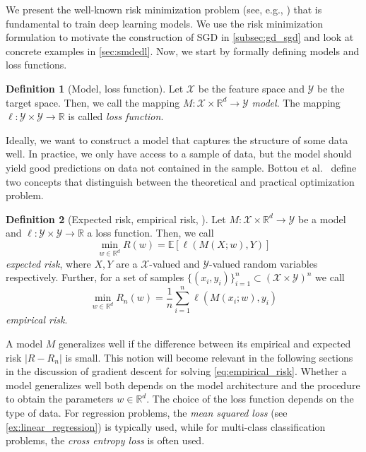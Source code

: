 \documentclass[12pt]{article}
\theoremstyle{definition}
\newtheorem{definition}[definition]{Definition}
\numberwithin{equation}{section}
\newcommand{\R}{\mathbb{R}}
\newcommand{\ev}[1]{\mathbb{E}\left[{#1}\right]}
\begin{document}
We present the well-known risk minimization problem (see, e.g., \cite{bottouOptimizationMethodsLargeScale2018}) that is fundamental to train deep learning models. We use the risk minimization formulation to motivate the construction of SGD in \autoref{subsec:gd_sgd} and look at concrete examples in \autoref{sec:smdedl}. Now, we start by formally defining models and loss functions.
\begin{definition}[Model, loss function]
  Let $\mathcal{X}$ be the feature space and $\mathcal{Y}$ be the target space. Then, we call the mapping $M : \mathcal{X} \times \R^d \rightarrow \mathcal{Y}$ \emph{model}. The mapping $\ell : \mathcal{Y} \times \mathcal{Y} \rightarrow \R$ is called \emph{loss function}.
\end{definition}
Ideally, we want to construct a model that captures the structure of some data well. In practice, we only have access to a sample of data, but the model should yield good predictions on data not contained in the sample. Bottou et al.\ \cite{bottouOptimizationMethodsLargeScale2018} define two concepts that distinguish between the theoretical and practical optimization problem.
\begin{definition}[Expected risk, empirical risk, ]
  Let $M : \mathcal{X} \times \R^d \rightarrow \mathcal{Y}$ be a model and $\ell : \mathcal{Y} \times \mathcal{Y} \rightarrow \R$ a loss function. Then, we call
  \begin{equation}
  \min_{w \in \R^d} R(w) = \ev{\ell(M(X;w),Y)}
\end{equation}
\emph{expected risk}, where $X,Y$ are a $\mathcal{X}$-valued and $\mathcal{Y}$-valued random variables respectively. Further, for a set of samples $\{(x_i, y_i)\}_{i=1}^n \subset (\mathcal{X} \times  \mathcal{Y})^n$ we call
\begin{equation}
  \label{eq:empirical_risk}
  \min_{w \in \R^d}  R_n(w) = \frac{1}{n}\sum_{i=1}^n\ell(M(x_i;w),y_i)
\end{equation}
\emph{empirical risk}.
\end{definition}
A model $M$ generalizes well if the difference between its empirical and expected risk $|R - R_n|$ is small. This notion will become relevant in the following sections in the discussion of gradient descent for solving \eqref{eq:empirical_risk}. Whether a model generalizes well both depends on the model architecture and the procedure to obtain the parameters $w \in \R^d$. 
The choice of the loss function depends on the type of data. For regression problems, the \emph{mean squared loss} (see \autoref{ex:linear_regression}) is typically used, while for multi-class classification problems, the \emph{cross entropy loss} is often used.
\end{document}
